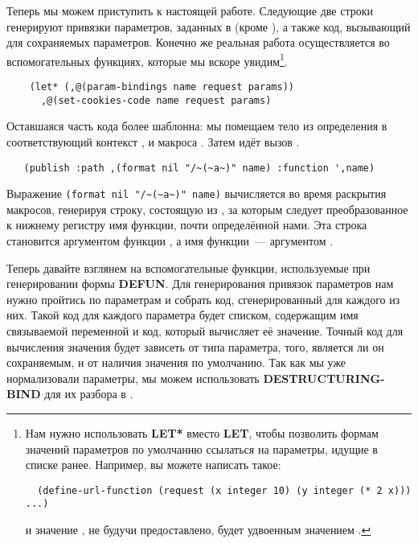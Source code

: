 Теперь мы можем приступить к настоящей работе. Следующие две строки генерируют привязки
параметров, заданных в  (кроме ), а также код,
вызывающий  для сохраняемых параметров. Конечно же реальная работа
осуществляется во вспомогательных функциях, которые мы вскоре увидим\footnote{Нам нужно
  использовать \textbf{LET* } вместо \textbf{LET}, чтобы позволить формам значений
  параметров по умолчанию ссылаться на параметры, идущие в списке ранее. Например, вы
  можете написать такое:

\begin{lstlisting}
  (define-url-function (request (x integer 10) (y integer (* 2 x))) ...)
\end{lstlisting}

и значение , не будучи предоставлено, будет удвоенным значением .}.

\begin{lstlisting}
    (let* (,@(param-bindings name request params))
      ,@(set-cookies-code name request params)
\end{lstlisting}

Оставшаяся часть кода более шаблонна: мы помещаем тело из определения
 в соответствующий контекст ,
 и макроса . Затем идёт вызов .

\begin{lstlisting}
   (publish :path ,(format nil "/~(~a~)" name) :function ',name)
\end{lstlisting}

Выражение \lstinline!(format nil "/~(~a~)" name)! вычисляется во время раскрытия макросов,
генерируя строку, состоящую из \code{/}, за которым следует преобразованное к нижнему
регистру имя функции, почти определённой нами. Эта строка становится аргументом
 функции , а имя функции~--- аргументом .

Теперь давайте взглянем на вспомогательные функции, используемые при генерировании формы
\textbf{DEFUN}. Для генерирования привязок параметров нам нужно пройтись по параметрам и
собрать код, сгенерированный  для каждого из них. Такой код для
каждого параметра будет списком, содержащим имя связываемой переменной и код, который
вычисляет её значение. Точный код для вычисления значения будет зависеть от типа
параметра, того, является ли он сохраняемым, и от наличия значения по умолчанию. Так как
мы уже нормализовали параметры, мы можем использовать \textbf{DESTRUCTURING-BIND} для их
разбора в .

